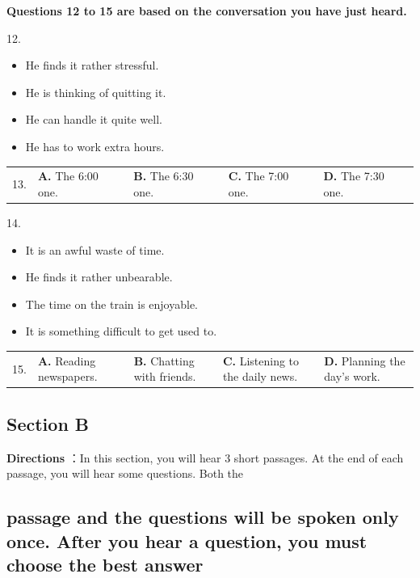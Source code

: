 \documentclass[UTF8,11pt]{ctexart}
\begin{document}
\textbf{Questions 12 to 15 are based on the conversation you have just heard.}


12.


\begin{itemize}[leftmargin=2em,itemsep=.2em,topsep=.4em]\item[A.] He finds it rather stressful.
\item[B.] He is thinking of quitting it.
\item[C.] He can handle it quite well.
\item[D.] He has to work extra hours.
\end{itemize}

\noindent\begin{tabularx}{\linewidth}{@{}lXXXX@{}}13. & \textbf{A.} The 6:00 one. & \textbf{B.} The 6:30 one. & \textbf{C.} The 7:00 one. & \textbf{D.} The 7:30 one.\\\end{tabularx}\par

14.


\begin{itemize}[leftmargin=2em,itemsep=.2em,topsep=.4em]\item[A.] It is an awful waste of time.
\item[B.] He finds it rather unbearable.
\item[C.] The time on the train is enjoyable.
\item[D.] It is something difficult to get used to.
\end{itemize}

\noindent\begin{tabularx}{\linewidth}{@{}lXXXX@{}}15. & \textbf{A.} Reading newspapers. & \textbf{B.} Chatting with friends. & \textbf{C.} Listening to the daily news. & \textbf{D.} Planning the day’s work.\\\end{tabularx}\par

\subsection*{\textbf{Section B}}


\textbf{Directions} ：In this section, you will hear 3 short passages. At the end of each passage, you will hear some questions. Both the


\subsection*{passage and the questions will be spoken only once. After you hear a question, you must choose the best answer}
\end{document}

